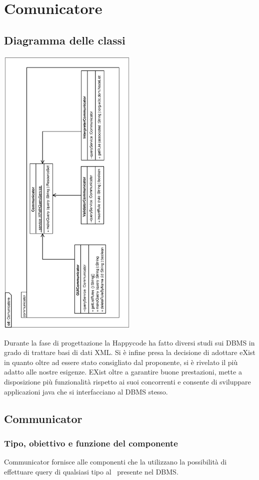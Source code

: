 \documentclass[11pt,titlepage,a4paper]{report}
\begin{document}
\section{Comunicatore}
\subsection{Diagramma delle classi}
\begin{center}
\includegraphics[width=0.5\textwidth, angle=-90]{DiagrammaClassi/Comunicatore.eps}
\end{center}
Durante la fase di progettazione la Happycode ha fatto diversi studi sui DBMS in grado di trattare basi di dati XML. Si \`e infine presa la decisione di adottare eXist in quanto oltre ad essere stato consigliato dal proponente, si \`e rivelato il pi\`u adatto alle nostre esigenze. EXist oltre a garantire buone prestazioni, mette a disposizione pi\`u funzionalit\`a rispetto ai suoi concorrenti e consente di sviluppare applicazioni java che si interfacciano al DBMS stesso.
\subsection{Communicator}
\subsubsection{Tipo, obiettivo e funzione del componente}
Communicator fornisce alle componenti che la utilizzano la possibilit\`a di effettuare query di qualsiasi tipo al \re\ presente nel DBMS.
\end{document}

